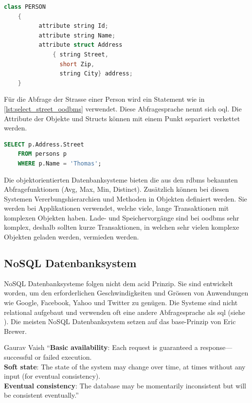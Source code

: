 \begin{lstlisting}[language=C++, caption=Objektdefinition in objektorientierem Datenbanksystem, label=lst:table_definition_oodbms]  
    class PERSON
    {
          attribute string Id;
          attribute string Name;
          attribute struct Address
              { string Street,
                short Zip,
                string City} address;
    }
\end{lstlisting}

Für die Abfrage der Strasse einer Person wird ein Statement wie in \autoref{lst:select_street_oodbms} verwendet. Diese Abfragesprache nennt
sich \gls{oql}. Die Attribute der Objekte und Structs können mit einem Punkt separiert verkettet werden.

\begin{lstlisting}[language=SQL, caption=Abfrage in objektorientierem Datenbanksystem, label=lst:select_street_oodbms]  
    SELECT p.Address.Street
    FROM persons p
    WHERE p.Name = 'Thomas';
\end{lstlisting}

Die objektorientierten Datenbanksysteme bieten die aus den \gls{rdbms} bekannten Abfragefunktionen (Avg, Max, Min, Distinct). 
Zusätzlich können bei diesen Systemen Vererbungshierarchien und Methoden in Objekten definiert werden. Sie werden bei Applikationen verwendet,
welche viele, lange Transaktionen mit komplexen Objekten haben. Lade- und Speichervorgänge sind bei \gls{oodbms} sehr komplex, deshalb 
sollten kurze Transaktionen, in welchen sehr vielen komplexe Objekten geladen werden, vermieden werden.

\subsection{NoSQL Datenbanksystem}\label{no_sql_db}
NoSQL Datenbanksysteme folgen nicht dem \gls{acid} Prinzip. Sie sind entwickelt worden, um den erforderlichen Geschwindigkeiten und Grössen von Anwendungen wie Google, 
Facebook, Yahoo und Twitter zu genügen. Die Systeme sind nicht relational aufgebaut und verwenden oft eine andere Abfragesprache als \gls{sql} (siehe \cite{vaish2013getting}). 
Die meisten NoSQL Datenbanksystem setzen auf das \gls{base}-Prinzip von Eric Brewer.

\begin{myQuote}{Gaurav Vaish \cite{vaish2013getting}}
"`\textbf{Basic availability}: Each request is guaranteed a response—successful or failed execution.\\
\textbf{Soft state}: The state of the system may change over time, at times without any input (for eventual consistency).\\
\textbf{Eventual consistency}: The database may be momentarily inconsistent but will be consistent eventually."'
\end{myQuote}

